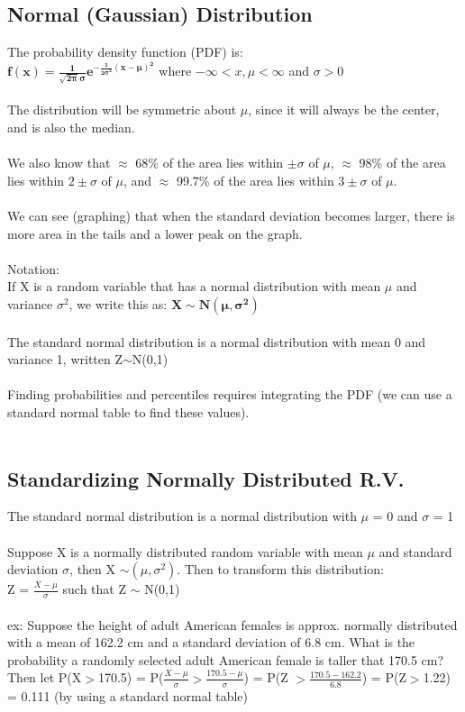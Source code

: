 \documentclass[12pt, a4paper]{article}
\begin{document}
	\subsection{Normal (Gaussian) Distribution}
	The probability density function (PDF) is: \\
	$\mathbf{f(x) = \frac{1}{\sqrt{2\pi}\sigma}e^{-\frac{1}{2\sigma^2}(x-\mu)^2}}$ where $-\infty < x,\mu < \infty$ and $\sigma >$0 \\~\\
	The distribution will be symmetric about $\mu$, since it will always be the center, and is also the median. \\~\\
	We also know that $\approx$ 68\% of the area lies within $\pm\sigma$ of $\mu$, $\approx$ 98\% of the area lies within $2\pm\sigma$ of $\mu$, and $\approx$ 99.7\% of the area lies within $3\pm\sigma$ of $\mu$. \\~\\
	We can see (graphing) that when the standard deviation becomes larger, there is more area in the tails and a lower peak on the graph. \\~\\
	Notation: \\
	If X is a random variable that has a normal distribution with mean $\mu$ and variance $\sigma^2$, we write this as:
	$\mathbf{X\sim N(\mu,\sigma^2)}$ \\~\\
	The standard normal distribution is a normal distribution with mean 0 and variance 1, written Z$\sim$N(0,1) \\~\\
	Finding probabilities and percentiles requires integrating the PDF (we can use a standard normal table to find these values). \\~\\
	
	\subsection{Standardizing Normally Distributed R.V.}
	The standard normal distribution is a normal distribution with $\mu$ = 0 and $\sigma$ = 1 \\~\\
	Suppose X is a normally distributed random variable with mean $\mu$ and standard deviation $\sigma$, then X $\sim(\mu,\sigma^2)$. Then to transform this distribution: \\ Z = $\frac{X-\mu}{\sigma}$ such that Z $\sim$ N(0,1) \\~\\
	ex: Suppose the height of adult American females is approx. normally distributed with a mean of 162.2 cm and a standard deviation of 6.8 cm. What is the probability a randomly selected adult American female is taller that 170.5 cm? \\
	Then let P(X$>$170.5) = P($\frac{X-\mu}{\sigma}>\frac{170.5-\mu}{\sigma}$) = P(Z $>\frac{170.5-162.2}{6.8}$) = P(Z$>$1.22) = 0.111 (by using a standard normal table) \newpage
	
\end{document}
